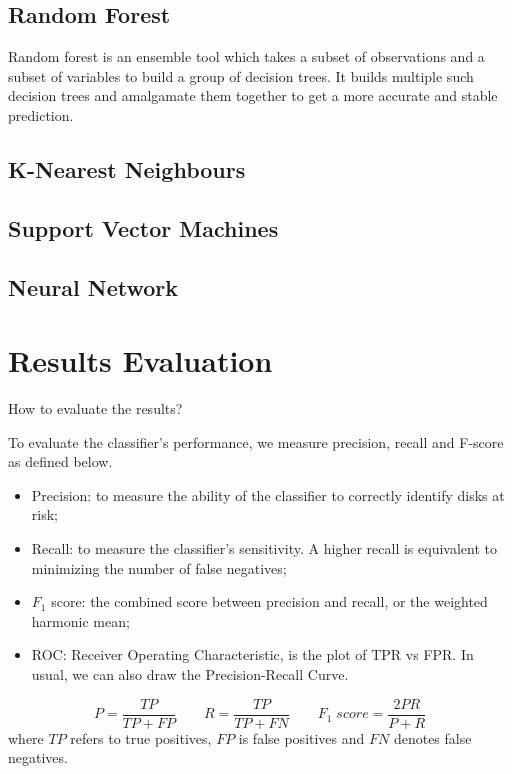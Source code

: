 \documentclass[12pt,a4paper,english]{amsart}
\begin{document}
\subsection*{Random Forest}

Random forest is an ensemble tool which takes a subset of observations and a subset of variables to build a group of decision trees. It builds multiple such decision trees and amalgamate them together to get a more accurate and stable prediction.

\subsection*{K-Nearest Neighbours}

\subsection*{Support Vector Machines}

\subsection*{Neural Network}

%
\section{Results Evaluation}

How to evaluate the results?

To evaluate the classifier's performance, we measure precision, recall and F-score as defined below.
\begin{itemize}
	\item Precision: to measure the ability of the classifier to correctly identify disks at risk;
	\item Recall: to measure the classifier's sensitivity. A higher recall is equivalent to minimizing the number of false negatives;
	\item $F_1$ score: the combined score between precision and recall, or the weighted harmonic mean;
	\item ROC: Receiver Operating Characteristic, is the plot of TPR vs FPR. In usual, we can also draw the Precision-Recall Curve.
\end{itemize}

\begin{equation}
	P = \dfrac{TP}{TP+FP} \quad\quad 
	R = \dfrac{TP}{TP+FN} \quad\quad 
	F_{1}\; score = \dfrac{2PR}{P+R}
\end{equation}
where $TP$ refers to true positives, $FP$ is false positives and $FN$ denotes false negatives.
\end{document}
